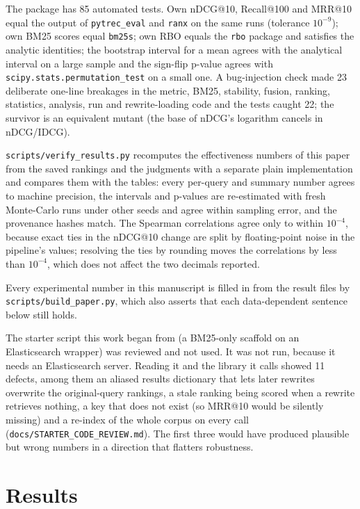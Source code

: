 \documentclass[
  11pt,
]{article}
\begin{document}
The package has 85 automated tests. Own nDCG@10, Recall@100 and MRR@10
equal the output of \texttt{pytrec\_eval} \citep{vangysel2018} and
\texttt{ranx} on the same runs (tolerance \(10^{-9}\)); own BM25 scores
equal \texttt{bm25s}; own RBO equals the \texttt{rbo} package and
satisfies the analytic identities; the bootstrap interval for a mean
agrees with the analytical interval on a large sample and the sign-flip
p-value agrees with \texttt{scipy.stats.permutation\_test} on a small
one. A bug-injection check made 23 deliberate one-line breakages in the
metric, BM25, stability, fusion, ranking, statistics, analysis, run and
rewrite-loading code and the tests caught 22; the survivor is an
equivalent mutant (the base of nDCG's logarithm cancels in nDCG/IDCG).

\texttt{scripts/verify\_results.py} recomputes the effectiveness numbers
of this paper from the saved rankings and the judgments with a separate
plain implementation and compares them with the tables: every per-query
and summary number agrees to machine precision, the intervals and
p-values are re-estimated with fresh Monte-Carlo runs under other seeds
and agree within sampling error, and the provenance hashes match. The
Spearman correlations agree only to within \(10^{-4}\), because exact
ties in the nDCG@10 change are split by floating-point noise in the
pipeline's values; resolving the ties by rounding moves the correlations
by less than \(10^{-4}\), which does not affect the two decimals
reported.

Every experimental number in this manuscript is filled in from the
result files by \texttt{scripts/build\_paper.py}, which also asserts
that each data-dependent sentence below still holds.

The starter script this work began from (a BM25-only scaffold on an
Elasticsearch wrapper) was reviewed and not used. It was not run,
because it needs an Elasticsearch server. Reading it and the library it
calls showed 11 defects, among them an aliased results dictionary that
lets later rewrites overwrite the original-query rankings, a stale
ranking being scored when a rewrite retrieves nothing, a key that does
not exist (so MRR@10 would be silently missing) and a re-index of the
whole corpus on every call (\texttt{docs/STARTER\_CODE\_REVIEW.md}). The
first three would have produced plausible but wrong numbers in a
direction that flatters robustness.

\hypertarget{results}{%
\section{Results}\label{results}}
\end{document}
